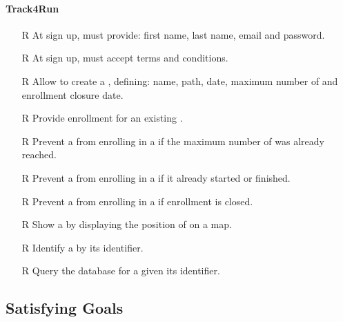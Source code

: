 \documentclass[../../rasd.tex]{subfiles}
\begin{document}
        \paragraph{Track4Run}
        \begin{itemize}
            \item[R\subs{39}]At sign up,  must provide: first name, last name, email and password.
            \item[R\subs{40}]At sign up,  must accept terms and conditions.
            \item[R\subs{41}]Allow  to create a , defining: name, path, date, maximum number of  and enrollment closure date. 
            \item[R\subs{42}]Provide  enrollment for an existing .
            \item[R\subs{43}]Prevent a  from enrolling in a  if the maximum number of  was already reached.
            \item[R\subs{44}]Prevent a  from enrolling in a  if it already started or finished.
            \item[R\subs{45}]Prevent a  from enrolling in a  if enrollment is closed.
            \item[R\subs{46}]Show a  by displaying the position of  on a map.
            \item[R\subs{47}]Identify a  by its identifier.
            \item[R\subs{48}]Query the database for a  given its identifier.
        \end{itemize}









        \subsection{Satisfying Goals}
\end{document}
